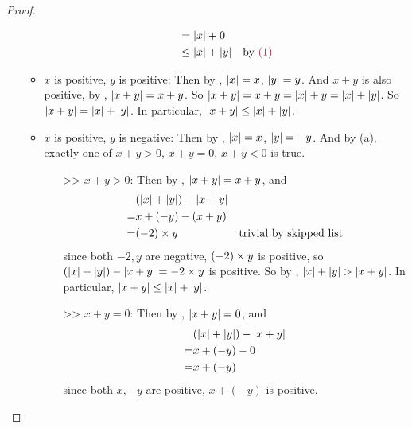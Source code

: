 \begin{proof}
\begin{enumerate}
\begin{itemize}
\begin{align*}
                                & = \abs{x} + 0 \\
                                & \le \abs{x} + \abs{y} & \text{by \MAROON{(1)}}
                \end{align*}
            \item \(x\) is positive, \(y\) is positive:
                Then by , \(\lvert x\rvert = x\), \(\lvert y\rvert = y\).
                And \(x + y\) is also positive, by , \(\lvert x + y\rvert = x + y\).
                So \(\lvert x + y\rvert = x + y = \lvert x\rvert + y = \lvert x\rvert + \lvert y\rvert\).
                So \(\lvert x + y\rvert = \lvert x\rvert + \lvert y\rvert\).
                In particular, \(\lvert x + y\rvert \le \lvert x\rvert + \lvert y\rvert\).
            \item \(x\) is positive, \(y\) is negative:
                Then by , \(\lvert x\rvert = x\), \(\lvert y\rvert = -y\).
                And by (a), exactly one of \(x + y > 0\), \(x + y = 0\), \(x + y < 0\) is true.
                \begin{itemize}
                    \item[>>] \(x + y > 0\):
                        Then by , \(\lvert x + y\rvert = x + y\), and
                        \begin{align*}
                               & (\lvert x\rvert + \lvert y\rvert) - \lvert x + y\rvert \\
                             = & x + (-y) - (x + y) \\
                             = & (-2) \times y & \text{trivial by skipped list} \\
                        \end{align*}
                        since both \(-2, y\) are negative, \((-2) \times y\) is positive, so \((\lvert x\rvert + \lvert y\rvert) - \lvert x + y\rvert = -2 \times y\) is positive.
                        So by , \(\lvert x\rvert + \lvert y\rvert > \lvert x + y\rvert\).
                        In particular, \(\lvert x + y\rvert \le \lvert x\rvert + \lvert y\rvert\).
                    \item[>>] \(x + y = 0\):
                        Then by , \(\lvert x + y\rvert = 0\), and
                        \begin{align*}
                               & (\lvert x\rvert + \lvert y\rvert) - \lvert x + y\rvert \\
                             = & x + (-y) - 0 \\
                             = & x + (-y)
                        \end{align*}
                        since both \(x, -y\) are positive, \(x + (-y)\) is positive.

\end{itemize}
\end{itemize}
\end{enumerate}
\end{proof}

